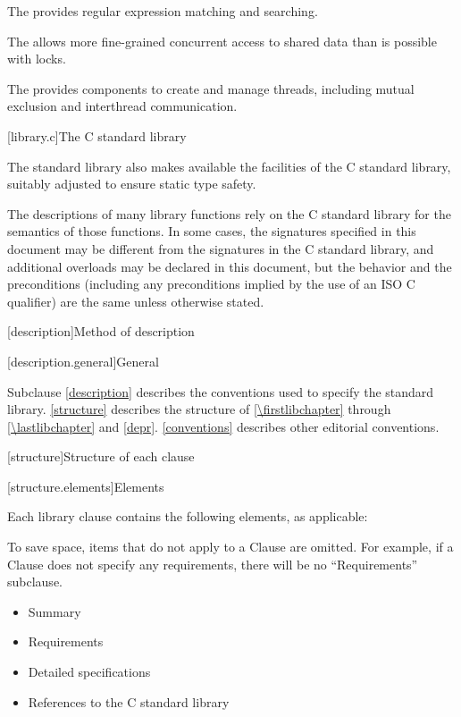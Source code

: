\pnum
The  provides regular expression matching and searching.

\pnum
The  allows more fine-grained
concurrent access to shared data than is possible with locks.

\pnum
The  provides components to create
and manage threads, including mutual exclusion and interthread communication.

[library.c]{The C standard library}

\pnum
The \Cpp{} standard library also makes available the facilities of the C standard library,
%
suitably adjusted to ensure static type safety.

\pnum
The descriptions of many library functions rely on the C standard library for
the semantics of those functions.
In some cases,
the signatures specified in this document
may be different from the signatures in the C standard library,
and additional overloads may be declared in this document,
but the behavior and the preconditions
(including any preconditions implied by the use of an
ISO C  qualifier)
are the same unless otherwise stated.

[description]{Method of description}

[description.general]{General}

\pnum
Subclause \ref{description} describes the conventions used to specify the \Cpp{} standard
library. \ref{structure} describes the structure of
\ref{\firstlibchapter} through \ref{\lastlibchapter} and
\ref{depr}. \ref{conventions} describes other editorial conventions.

[structure]{Structure of each clause}

[structure.elements]{Elements}

\pnum
Each library clause contains the following elements, as applicable:
\begin{footnote}
To
save space, items that do not apply to a Clause are omitted.
For example, if a Clause does not specify any requirements,
there will be no ``Requirements'' subclause.
\end{footnote}
\begin{itemize}
\item Summary
\item Requirements
\item Detailed specifications
\item References to the C standard library
\end{itemize}

